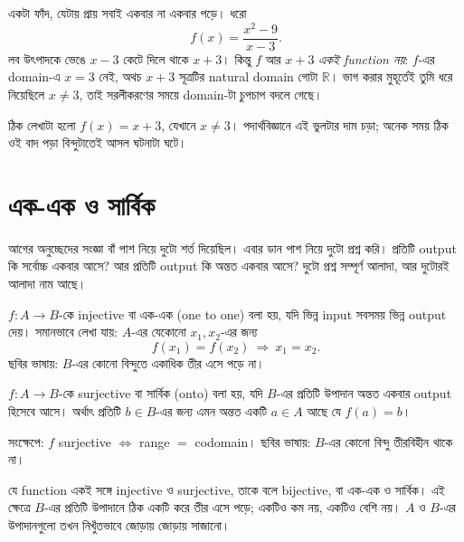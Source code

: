 \documentclass[11pt]{article}
\begin{document}
\begin{remark}
একটা ফাঁদ, যেটায় প্রায় সবাই একবার না একবার পড়ে। ধরো
\[
  f(x) = \frac{x^2 - 9}{x - 3}.
\]
লব উৎপাদকে ভেঙে $x - 3$ কেটে দিলে থাকে $x + 3$। কিন্তু $f$ আর $x + 3$
\emph{একই function নয়}: $f$-এর domain-এ $x = 3$ নেই, অথচ $x + 3$ সূত্রটির
natural domain গোটা $\mathbb{R}$। ভাগ করার মুহূর্তেই তুমি ধরে নিয়েছিলে
$x \neq 3$, তাই সরলীকরণের সময়ে domain-টা চুপচাপ বদলে গেছে।

ঠিক লেখাটা হলো $f(x) = x + 3$, যেখানে $x \neq 3$। পদার্থবিজ্ঞানে এই ভুলটার
দাম চড়া; অনেক সময় ঠিক ওই বাদ পড়া বিন্দুটাতেই আসল ঘটনাটা ঘটে।
\end{remark}

\section{এক-এক ও সার্বিক}

আগের অনুচ্ছেদের সংজ্ঞা বাঁ পাশ নিয়ে দুটো শর্ত দিয়েছিল। এবার ডান পাশ নিয়ে
দুটো প্রশ্ন করি। প্রতিটি output কি সর্বোচ্চ একবার আসে? আর প্রতিটি output কি
অন্তত একবার আসে? দুটো প্রশ্ন সম্পূর্ণ আলাদা, আর দুটোরই আলাদা নাম আছে।

\begin{idea}[এক-এক ফাংশন]
$f \colon A \to B$-কে injective বা এক-এক (one to one) বলা হয়, যদি ভিন্ন input সবসময় ভিন্ন
output দেয়। সমানভাবে লেখা যায়: $A$-এর যেকোনো $x_1, x_2$-এর জন্য
\[
  f(x_1) = f(x_2) \ \Longrightarrow\ x_1 = x_2 .
\]
ছবির ভাষায়: $B$-এর কোনো বিন্দুতে একাধিক তীর এসে পড়ে না।
\end{idea}

\begin{idea}[সার্বিক ফাংশন]
$f \colon A \to B$-কে surjective বা সার্বিক (onto) বলা হয়, যদি $B$-এর প্রতিটি উপাদান
অন্তত একবার output হিসেবে আসে। অর্থাৎ প্রতিটি $b \in B$-এর জন্য এমন অন্তত
একটি $a \in A$ আছে যে $f(a) = b$।

সংক্ষেপে: $f$ surjective $\iff$ range $= $ codomain। ছবির ভাষায়: $B$-এর কোনো
বিন্দু তীরবিহীন থাকে না।
\end{idea}

\begin{idea}[বাইজেকশন]
যে function একই সঙ্গে injective ও surjective, তাকে বলে bijective, বা
এক-এক ও সার্বিক। এই ক্ষেত্রে $B$-এর প্রতিটি উপাদানে ঠিক একটি করে তীর এসে
পড়ে; একটিও কম নয়, একটিও বেশি নয়। $A$ ও $B$-এর উপাদানগুলো তখন নিখুঁতভাবে
জোড়ায় জোড়ায় সাজানো।
\end{idea}
\end{document}
